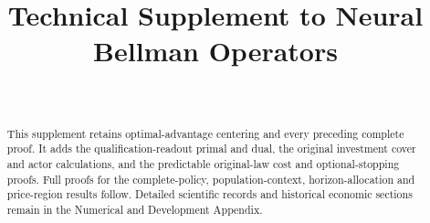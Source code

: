 \documentclass[ecta,nameyear,draft]{econsocart}
\begin{document}
\begin{frontmatter}
\title{Technical Supplement to Neural Bellman Operators}
\begin{aug}
\author[id=au1,addressref={add1}]{~}
\address[id=add1]{Peking University}
\end{aug}
\begin{abstract}
This supplement retains optimal-advantage centering and every preceding complete proof. It adds the qualification-readout primal and dual, the original investment cover and actor calculations, and the predictable original-law cost and optional-stopping proofs. Full proofs for the complete-policy, population-context, horizon-allocation and price-region results follow. Detailed scientific records and historical economic sections remain in the Numerical and Development Appendix.
\end{abstract}
\end{frontmatter}









\end{document}
